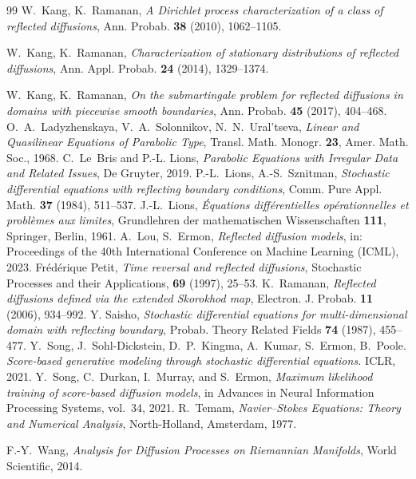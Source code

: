 \documentclass[11pt]{amsart}
\theoremstyle{definition}
\begin{document}
\begin{thebibliography}{99}
W.~Kang, K.~Ramanan,
\emph{A Dirichlet process characterization of a class of reflected
diffusions}, Ann. Probab. \textbf{38} (2010), 1062--1105.

W.~Kang, K.~Ramanan,
\emph{Characterization of stationary distributions of reflected
diffusions}, Ann. Appl. Probab. \textbf{24} (2014), 1329--1374.

W.~Kang, K.~Ramanan,
\emph{On the submartingale problem for reflected diffusions in
domains with piecewise smooth boundaries}, Ann. Probab.
\textbf{45} (2017), 404--468.
O.~A.~Ladyzhenskaya, V.~A.~Solonnikov, N.~N.~Ural'tseva,
\emph{Linear and Quasilinear Equations of Parabolic Type}, Transl.
Math. Monogr. \textbf{23}, Amer. Math. Soc., 1968.
{ C.~Le~Bris and P.-L. Lions},  {\em Parabolic Equations
  with Irregular Data and Related Issues}, {De Gruyter}, 2019.
P.-L.~Lions, A.-S.~Sznitman,
\emph{Stochastic differential equations with reflecting boundary
conditions}, Comm. Pure Appl. Math. \textbf{37} (1984), 511--537.
J.-L.~Lions,
\emph{\'Equations diff\'erentielles op\'erationnelles et probl\`emes
aux limites}, Grundlehren der mathematischen Wissenschaften
\textbf{111}, Springer, Berlin, 1961.
A.~Lou, S.~Ermon,
\emph{Reflected diffusion models}, in: Proceedings of the 40th
International Conference on Machine Learning (ICML), 2023.
Fr\'ed\'erique Petit, \emph{Time reversal and reflected diffusions}, Stochastic Processes and their Applications, \textbf{69} (1997), 25--53.
K.~Ramanan,
\emph{Reflected diffusions defined via the extended Skorokhod map},
Electron. J. Probab. \textbf{11} (2006), 934--992.
Y. Saisho, \emph{Stochastic differential equations for multi-dimensional domain with reflecting boundary}, Probab. Theory Related Fields \textbf{74} (1987), 455--477.
 Y.~Song, J.~Sohl-Dickstein, D.~P.~Kingma, A.~Kumar, S.~Ermon, B.~Poole.
  \emph{Score-based generative modeling through stochastic differential equations.} ICLR, 2021.
{ Y.~Song, C.~Durkan, I.~Murray, and S.~Ermon}, {\em Maximum likelihood
  training of score-based diffusion models}, in Advances in Neural Information
  Processing Systems, %
  vol.~34, 2021.
R.~Temam,
\emph{Navier--Stokes Equations: Theory and Numerical Analysis},
North-Holland, Amsterdam, 1977.

F.-Y.~Wang,
\emph{Analysis for Diffusion Processes on Riemannian Manifolds},
World Scientific, 2014.

\end{thebibliography}
\end{document}
